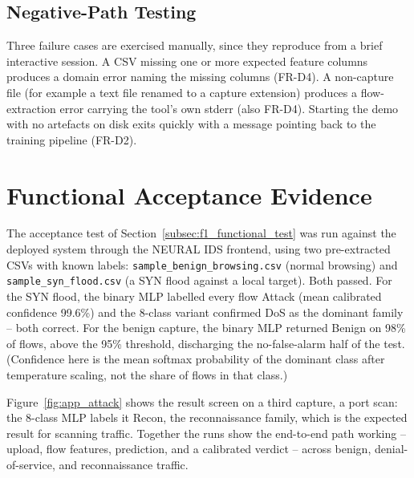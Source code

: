 \subsection{Negative-Path Testing}
\label{subsec:negative_path_testing}

\par Three failure cases are exercised manually, since they reproduce from a brief interactive session. A CSV missing one or more expected feature columns produces a domain error naming the missing columns (FR-D4). A non-capture file (for example a text file renamed to a capture extension) produces a flow-extraction error carrying the tool's own stderr (also FR-D4). Starting the demo with no artefacts on disk exits quickly with a message pointing back to the training pipeline (FR-D2).

\section{Functional Acceptance Evidence}
\label{sec:f1_acceptance_evidence}

\par The acceptance test of Section~\ref{subsec:f1_functional_test} was run against the deployed system through the NEURAL IDS frontend, using two pre-extracted CSVs with known labels: \texttt{sample\_benign\_browsing.csv} (normal browsing) and \texttt{sample\_syn\_flood.csv} (a SYN flood against a local target). Both passed. For the SYN flood, the binary MLP labelled every flow Attack (mean calibrated confidence 99.6\%) and the 8-class variant confirmed DoS as the dominant family -- both correct. For the benign capture, the binary MLP returned Benign on 98\% of flows, above the 95\% threshold, discharging the no-false-alarm half of the test. (Confidence here is the mean softmax probability of the dominant class after temperature scaling, not the share of flows in that class.)

\par Figure~\ref{fig:app_attack} shows the result screen on a third capture, a port scan: the 8-class MLP labels it Recon, the reconnaissance family, which is the expected result for scanning traffic. Together the runs show the end-to-end path working -- upload, flow features, prediction, and a calibrated verdict -- across benign, denial-of-service, and reconnaissance traffic.
